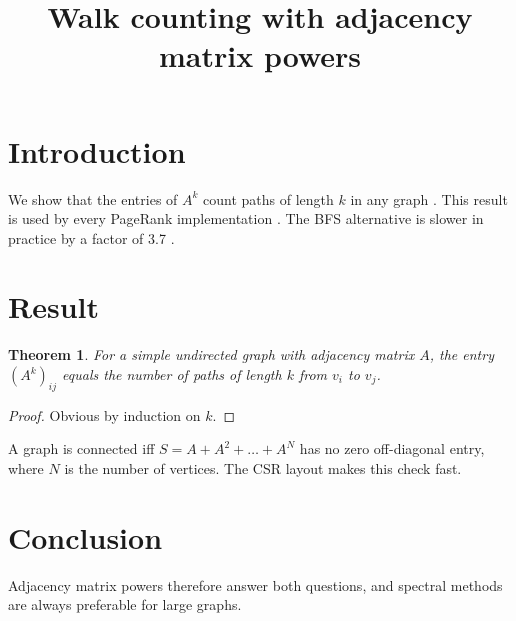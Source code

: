 \documentclass[11pt,a4paper]{article}
\title{Walk counting with adjacency matrix powers}
\author{}
\date{}
\newtheorem{theorem}{Theorem}
\begin{document}
\maketitle

\section{Introduction}\label{sec:intro}
We show that the entries of $A^k$ count paths of length $k$ in any graph
\cite{diestel2017graph}. This result is used by every PageRank
implementation \cite{page1999pagerank}. The BFS alternative is slower in
practice by a factor of 3.7 \cite{smith2021walks}.

\section{Result}\label{sec:result}
\begin{theorem}
For a simple undirected graph with adjacency matrix $A$, the entry
$(A^k)_{ij}$ equals the number of paths of length $k$ from $v_i$ to $v_j$.
\end{theorem}
\begin{proof}
Obvious by induction on $k$.
\end{proof}

A graph is connected iff $S = A + A^2 + \dots + A^{N}$ has no zero
off-diagonal entry, where $N$ is the number of vertices. The CSR layout
makes this check fast.

\section{Conclusion}\label{sec:conclusion}
Adjacency matrix powers therefore answer both questions, and spectral
methods are always preferable for large graphs.

\printbibliography
\end{document}
